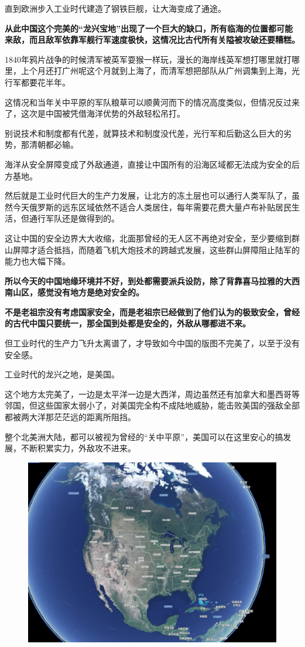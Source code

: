 \documentclass[UTF8, 11pt, oneside]{ctexart}
\newcommand{\zd}[1]{\textbf{\textcolor[RGB]{123,12,0}{#1}}} %
\begin{document}
直到欧洲步入工业时代建造了钢铁巨舰，让大海变成了通途。

\zd{从此中国这个完美的“龙兴宝地”出现了一个巨大的缺口，所有临海的位置都可能来敌，而且敌军依靠军舰行军速度极快，这情况比古代所有关隘被攻破还要糟糕。}

1840年鸦片战争的时候清军被英军耍猴一样玩，漫长的海岸线英军想打哪里就打哪里，上个月还打广州呢这个月就到上海了，而清军想把部队从广州调集到上海，光行军都要花半年。

这情况和当年关中平原的军队粮草可以顺黄河而下的情况高度类似，但情况反过来了，这次是中国被凭借海洋优势的外敌轻松吊打。

别说技术和制度都有代差，就算技术和制度没代差，光行军和后勤这么巨大的劣势，那清朝都必输。

海洋从安全屏障变成了外敌通道，直接让中国所有的沿海区域都无法成为安全的后方基地。

然后就是工业时代巨大的生产力发展，让北方的冻土层也可以通行人类军队了，虽然今天俄罗斯的远东区域依然不适合人类居住，每年需要花费大量卢布补贴居民生活，但通行军队还是做得到的。

这让中国的安全边界大大收缩，北面那曾经的无人区不再绝对安全，至少要缩到群山屏障才适合抵挡，而随着飞机大炮技术的跨越式发展，这些群山屏障阻止陆军的能力也大幅下降。

\zd{所以今天的中国地缘环境并不好，到处都需要派兵设防，除了背靠喜马拉雅的大西南山区，感觉没有地方是绝对安全的。}

\zd{不是老祖宗没有考虑国家安全，而是老祖宗已经做到了他们认为的极致安全，曾经的古代中国只要统一，那全国到处都是安全的，外敌从哪都进不来。}

但工业时代的生产力飞升太离谱了，才导致如今中国的版图不完美了，以至于没有安全感。

工业时代的龙兴之地，是美国。

这个地方太完美了，一边是太平洋一边是大西洋，周边虽然还有加拿大和墨西哥等邻国，但这些国家太弱小了，对美国完全构不成陆地威胁，能击败美国的强敌全部都被两大洋那茫茫远的距离所阻挡。

整个北美洲大陆，都可以被视为曾经的“关中平原”，美国可以在这里安心的搞发展，不断积累实力，外敌攻不进来。

\begin{figure}[H]
    \centering
    \includegraphics[width=13cm]{2024-08-19-010.jpg}
\end{figure}
\end{document}
